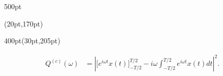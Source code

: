 \begin{frame}
\begin{textblock*}{500pt}
\begin{minipage}{0.0\linewidth}
\end{minipage}
\end{textblock*}






\begin{textblock*}{\linewidth}(20pt,170pt)
\end{textblock*}


\begin{textblock*}{400pt}(30pt,205pt)
\scriptsize

\begin{align}
    Q^{(c)}(\omega) & = \left|\Bigg[ e^{i\omega t} x(t)\Bigg]_{-T/2}^{T/2}
               -i\omega \int_{-T/2}^{T/2} e^{i\omega t}x(t)dt\right|^2.
                \nonumber
\end{align}

\end{textblock*}

\end{frame}










